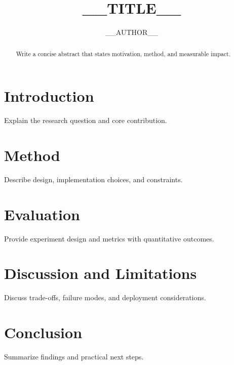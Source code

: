 \documentclass[sigconf]{acmart}
\title{__TITLE__}
\author{__AUTHOR__}
\affiliation{\institution{Institution Name}}
\begin{document}
\begin{abstract}
Write a concise abstract that states motivation, method, and measurable impact.
\end{abstract}

\maketitle

\section{Introduction}
Explain the research question and core contribution.

\section{Method}
Describe design, implementation choices, and constraints.

\section{Evaluation}
Provide experiment design and metrics with quantitative outcomes.

\section{Discussion and Limitations}
Discuss trade-offs, failure modes, and deployment considerations.

\section{Conclusion}
Summarize findings and practical next steps.



\end{document}
